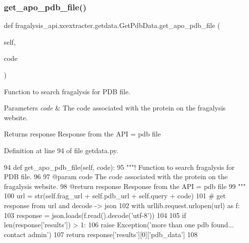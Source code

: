 \subsubsection{\texorpdfstring{get\+\_\+apo\+\_\+pdb\+\_\+file()}{get\_apo\_pdb\_file()}}
{\footnotesize\ttfamily def fragalysis\+\_\+api.\+xcextracter.\+getdata.\+Get\+Pdb\+Data.\+get\+\_\+apo\+\_\+pdb\+\_\+file (\begin{DoxyParamCaption}\item[{}]{self,  }\item[{}]{code }\end{DoxyParamCaption})}



Function to search fragalysis for P\+DB file. 


\begin{DoxyParams}{Parameters}
{\em code} & The code associated with the protein on the fragalysis website. \\
\hline
\end{DoxyParams}
\begin{DoxyReturn}{Returns}
response Response from the A\+PI = pdb file 
\end{DoxyReturn}


Definition at line 94 of file getdata.\+py.


\begin{DoxyCode}
94     \textcolor{keyword}{def }get\_apo\_pdb\_file(self, code):
95         \textcolor{stringliteral}{"""! Function to search fragalysis for PDB file.}
96 \textcolor{stringliteral}{}
97 \textcolor{stringliteral}{        @param code The code associated with the protein on the fragalysis website.}
98 \textcolor{stringliteral}{        @return response Response from the API = pdb file}
99 \textcolor{stringliteral}{        """}
100         url = str(self.frag\_url + self.pdb\_url + self.query + code)
101         \textcolor{comment}{# get response from url and decode -> json}
102         with urllib.request.urlopen(url) \textcolor{keyword}{as} f:
103             response = json.loads(f.read().decode(\textcolor{stringliteral}{'utf-8'}))
104 
105         \textcolor{keywordflow}{if} len(response[\textcolor{stringliteral}{'results'}]) > 1:
106             \textcolor{keywordflow}{raise} Exception(\textcolor{stringliteral}{'more than one pdb found... contact admin'})
107         \textcolor{keywordflow}{return} response[\textcolor{stringliteral}{'results'}][0][\textcolor{stringliteral}{'pdb\_data'}]
108 
\end{DoxyCode}
\mbox{\label{classfragalysis__api_1_1xcextracter_1_1getdata_1_1_get_pdb_data_afcb12b3a8f39a7d54917eefed0a1b4af}} 
